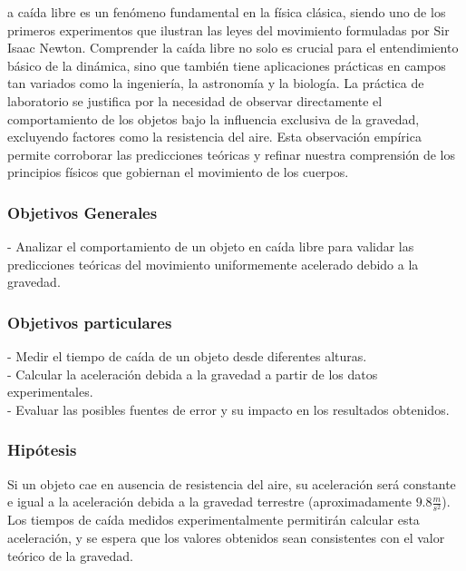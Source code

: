 \documentclass[journal]{IEEEtran}
\begin{document}
a caída libre es un fenómeno fundamental en la física clásica, siendo uno de los primeros experimentos que ilustran las leyes del movimiento formuladas por Sir Isaac Newton. Comprender la caída libre no solo es crucial para el entendimiento básico de la dinámica, sino que también tiene aplicaciones prácticas en campos tan variados como la ingeniería, la astronomía y la biología. La práctica de laboratorio se justifica por la necesidad de observar directamente el comportamiento de los objetos bajo la influencia exclusiva de la gravedad, excluyendo factores como la resistencia del aire. Esta observación empírica permite corroborar las predicciones teóricas y refinar nuestra comprensión de los principios físicos que gobiernan el movimiento de los cuerpos.\\

\subsubsection{Objetivos Generales}

 - Analizar el comportamiento de un objeto en caída libre para validar las predicciones teóricas del movimiento uniformemente acelerado debido a la gravedad.\\

\subsubsection{Objetivos particulares}
- Medir el tiempo de caída de un objeto desde diferentes alturas.\\
- Calcular la aceleración debida a la gravedad a partir de los datos experimentales.\\
- Evaluar las posibles fuentes de error y su impacto en los resultados obtenidos.\\

\subsubsection{Hipótesis}
Si un objeto cae en ausencia de resistencia del aire, su aceleración será constante e igual a la aceleración debida a la gravedad terrestre (aproximadamente \(9.8 \frac{m}{s^{2}}\)). Los tiempos de caída medidos experimentalmente permitirán calcular esta aceleración, y se espera que los valores obtenidos sean consistentes con el valor teórico de la gravedad.\\
\end{document}
